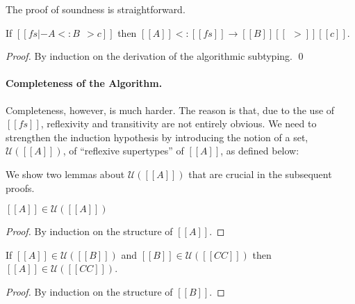 
The proof of soundness is straightforward.
\begin{mtheorem}[Soundness] \label{thm:soundness}
  If $[[ fs |- A <: B ~~> c]]$ then $[[A]] <: [[fs]] \rightarrow [[B]] [[~~>]] [[c]]$.
\end{mtheorem}
\begin{proof}
  By induction on the derivation of the algorithmic subtyping. \qed
\end{proof}


\paragraph{Completeness of the Algorithm.}


\newcommand{\U}[1]{\mathcal{U}(#1)}

Completeness, however, is much harder. The reason is that, due to the use of
$[[fs]]$, reflexivity and transitivity are not entirely obvious. We need to
strengthen the induction hypothesis by introducing the notion of a set,
$\U{[[A]]}$, of ``reflexive supertypes'' of $[[A]]$, as defined below:

We show two lemmas about $\U{[[A]]}$ that are crucial in the subsequent proofs.

\begin{lemma} \label{lemma:set_refl}
  $[[A]] \in \U{[[A]]}$
\end{lemma}
\begin{proof}
  By induction on the structure of $[[A]]$.
\end{proof}

\begin{lemma} \label{lemma:set_trans}
  If $[[A]] \in \U{[[B]]}$ and $[[B]] \in \U{[[CC]]}$ then $[[A]] \in \U{[[CC]]}$.
\end{lemma}
\begin{proof}
  By induction on the structure of $[[B]]$.
\end{proof}

